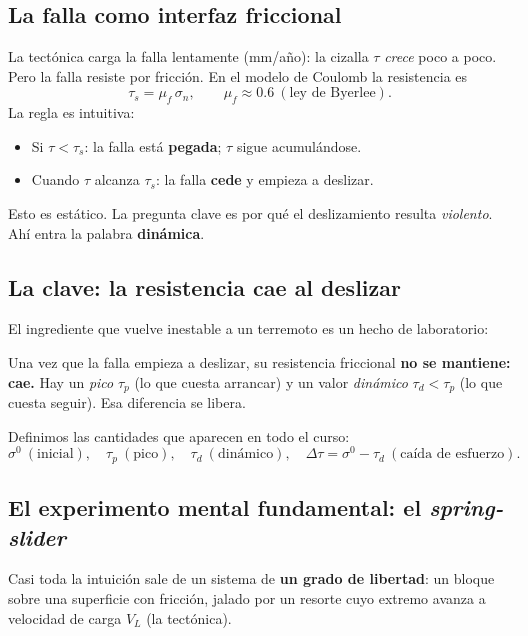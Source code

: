 \documentclass[11pt,a4paper]{article}
\newcommand{\taup}{\tau_p}
\newcommand{\taud}{\tau_d}
\begin{document}
\subsection{La falla como interfaz friccional}
La tectónica carga la falla lentamente (mm/año): la cizalla $\tau$ \emph{crece}
poco a poco. Pero la falla resiste por fricción. En el modelo de Coulomb la
resistencia es
\begin{equation}
  \tau_s = \mu_f\,\sigma_n,\qquad \mu_f\approx 0.6\ (\text{ley de Byerlee}).
\end{equation}
La regla es intuitiva:
\begin{itemize}
  \item Si $\tau<\tau_s$: la falla está \textbf{pegada}; $\tau$ sigue acumulándose.
  \item Cuando $\tau$ alcanza $\tau_s$: la falla \textbf{cede} y empieza a deslizar.
\end{itemize}
Esto es estático. La pregunta clave es por qué el deslizamiento resulta
\emph{violento}. Ahí entra la palabra \textbf{dinámica}.

\subsection{La clave: la resistencia cae al deslizar}
El ingrediente que vuelve inestable a un terremoto es un hecho de laboratorio:
\begin{keybox}
Una vez que la falla empieza a deslizar, su resistencia friccional \textbf{no se
mantiene: cae.} Hay un \emph{pico} $\taup$ (lo que cuesta arrancar) y un valor
\emph{dinámico} $\taud<\taup$ (lo que cuesta seguir). Esa diferencia se libera.
\end{keybox}
Definimos las cantidades que aparecen en todo el curso:
\[
  \sigma^0\ (\text{inicial}),\quad
  \taup\ (\text{pico}),\quad
  \taud\ (\text{dinámico}),\quad
  \Delta\tau=\sigma^0-\taud\ (\text{caída de esfuerzo}).
\]

\subsection{El experimento mental fundamental: el \emph{spring-slider}}
Casi toda la intuición sale de un sistema de \textbf{un grado de libertad}: un
bloque sobre una superficie con fricción, jalado por un resorte cuyo extremo
avanza a velocidad de carga $V_L$ (la tectónica).
\end{document}
